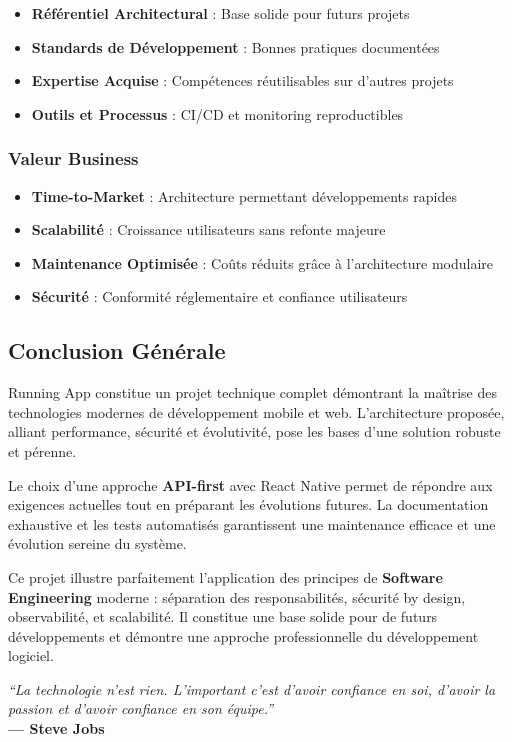 \begin{itemize}
    \item \textbf{Référentiel Architectural} : Base solide pour futurs projets
    \item \textbf{Standards de Développement} : Bonnes pratiques documentées
    \item \textbf{Expertise Acquise} : Compétences réutilisables sur d'autres projets
    \item \textbf{Outils et Processus} : CI/CD et monitoring reproductibles
\end{itemize}

\subsubsection{Valeur Business}

\begin{itemize}
    \item \textbf{Time-to-Market} : Architecture permettant développements rapides
    \item \textbf{Scalabilité} : Croissance utilisateurs sans refonte majeure
    \item \textbf{Maintenance Optimisée} : Coûts réduits grâce à l'architecture modulaire
    \item \textbf{Sécurité} : Conformité réglementaire et confiance utilisateurs
\end{itemize}

\subsection{Conclusion Générale}

Running App constitue un projet technique complet démontrant la maîtrise des technologies modernes de développement mobile et web. L'architecture proposée, alliant performance, sécurité et évolutivité, pose les bases d'une solution robuste et pérenne.

Le choix d'une approche \textbf{API-first} avec React Native permet de répondre aux exigences actuelles tout en préparant les évolutions futures. La documentation exhaustive et les tests automatisés garantissent une maintenance efficace et une évolution sereine du système.

Ce projet illustre parfaitement l'application des principes de \textbf{Software Engineering} moderne : séparation des responsabilités, sécurité by design, observabilité, et scalabilité. Il constitue une base solide pour de futurs développements et démontre une approche professionnelle du développement logiciel.

\vspace{1cm}

\begin{center}
\textit{``La technologie n'est rien. L'important c'est d'avoir confiance en soi, d'avoir la passion et d'avoir confiance en son équipe.''} \\
\textbf{--- Steve Jobs}
\end{center}